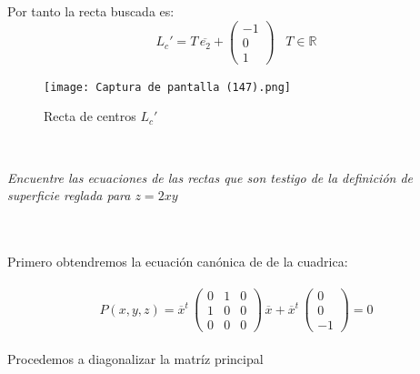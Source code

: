 \documentclass[11pt,letterpaper]{article}
\newcommand{\R}{\mathbb{R}}
\begin{document}
    Por tanto la recta buscada es:\,\\
    \begin{equation*}
        L_{c}'=T\,\overline{e_2}+\begin{pmatrix}
                -1 \\
                0\\
                1
                \end{pmatrix}\,\,\,\,\,T\in \R
    \end{equation*}
\begin{figure}
    \centering
    \texttt{[image: Captura de pantalla (147).png]}
    \caption{Recta de centros $L_{c}'$}
    \label{Cono rebanado}
     \end{figure}\,\\
     \newpage
    \begin{tcolorbox}[
	title = \textcolor{black}{\textcolor{white}{Problema 3}},]
\textit{Encuentre las ecuaciones de las rectas que son testigo de la definici\'on de superficie reglada
para $z=2xy$
}
\end{tcolorbox}\,\\
\,\\
Primero obtendremos la ecuaci\'on can\'onica de de la cuadrica:\,\\
\,\\
\begin{equation*}
        P(x,y,z)=\overline{x}^t\,\begin{pmatrix}
                0 & 1 & 0\\
                1& 0 & 0\\
                0 & 0 & 0
                \end{pmatrix}\,\overline{x}+\overline{x}^t\,
                \begin{pmatrix}
                0 \\
                0\\
                -1
                \end{pmatrix}=0
    \end{equation*}\,\\
     Procedemos a diagonalizar la matr\'iz principal\,\\
    \,\\
\end{document}
